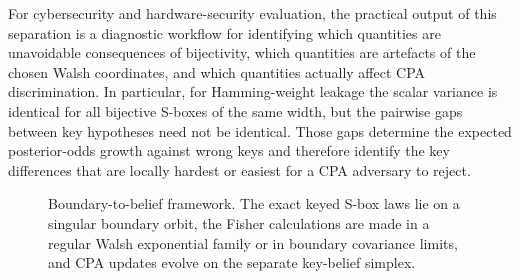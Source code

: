 For cybersecurity and hardware-security evaluation, the practical output of
this separation is a
diagnostic workflow for identifying which quantities are unavoidable
consequences of bijectivity, which quantities are artefacts of the chosen
Walsh coordinates, and which quantities actually affect CPA discrimination.
In particular, for Hamming-weight leakage the scalar variance is identical for
all bijective S-boxes of the same width, but the pairwise gaps between key
hypotheses need not be identical.  Those gaps determine the expected
posterior-odds growth against wrong keys and therefore identify the key
differences that are locally hardest or easiest for a CPA adversary to reject.

\begin{figure}[t]
\centering
{}
\caption{Boundary-to-belief framework. The exact keyed S-box laws lie on a
singular boundary orbit, the Fisher calculations are made in a regular Walsh
exponential family or in boundary covariance limits, and CPA updates evolve on
the separate key-belief simplex.}
\label{fig:framework}
\end{figure}

